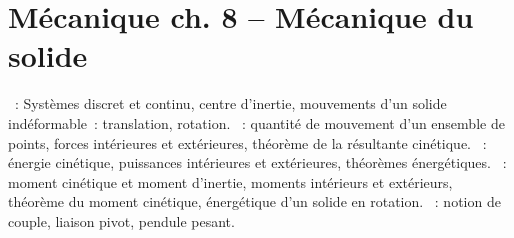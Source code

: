 \documentclass[a4paper, 12pt, final, garamond]{book}
\begin{document}
\section*{Mécanique ch. 8 -- Mécanique du solide}
\begin{enumerate}[label=\Roman*]
    ~: Systèmes discret et continu, centre
    d'inertie, mouvements d'un solide indéformable~: translation, rotation.
    ~: quantité de mouvement d'un ensemble de points, forces
    intérieures et extérieures, théorème de la résultante cinétique.
    ~: énergie cinétique, puissances
    intérieures et extérieures, théorèmes énergétiques.
    ~: moment cinétique et moment
    d'inertie, moments intérieurs et extérieurs, théorème du moment cinétique,
    énergétique d'un solide en rotation.
    ~: notion de couple, liaison pivot,
    pendule pesant.
\end{enumerate}
\end{document}
